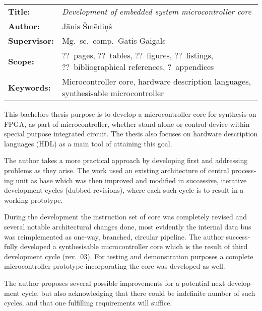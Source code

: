 \clearpage
\begin{english} %
	\abstitlestyle{\abstractname} %
	\noindent%
	\begin{tabularx}{\textwidth}{lX}
		\textbf{Title:} & 
			\textit{Development of embedded system microcontroller core}\\[1ex]
		\textbf{Author:} & Jānis Šmēdiņš\\[1ex]
		\textbf{Supervisor:} & Mg.~sc.~comp.~Gatis Gaigals\\[1ex]
		\textbf{Scope:} & ??~pages, ??~tables, ??~figures, ??~listings,
			??~bibliographical references, ?~appendices\\[1ex]
		\textbf{Keywords:} & Microcontroller core, hardware description languages,
				synthesisable microcontroller
	\end{tabularx}
	
	\vspace{1em}
	This bachelors thesis purpose is to develop a microcontroller core for
	synthesis on FPGA, as part of microcontroller, whether stand-alone or
	control device within special purpose integrated circuit.
	The thesis also focuses on hardware description languages
	(HDL) as a main tool of attaining this goal.
	
	The author takes a more practical approach by developing first and
	addressing problems as they arise. The work used an existing
	architecture of central processing unit as base which was then improved
	and modified in successive, iterative development cycles
	(dubbed revisions), where each such cycle is to result in a working
	prototype.
	
	During the development the instruction set of core was completely
	revised and several notable architectural changes done, most evidently
	the internal data bus was reimplemented as one-way, branched, circular
	pipeline. The author successfully developed a synthesisable
	microcontroller core which is the result of third development cycle (rev.~03).
	For testing	and demonstration purposes a complete microcontroller prototype
	incorporating the core was developed as well.
	
	The author proposes several possible improvements for a
	potential next development cycle, but also acknowledging that there
	could be indefinite number of such cycles, and that one fulfilling
	requirements will suffice.
	
	

\end{english}

